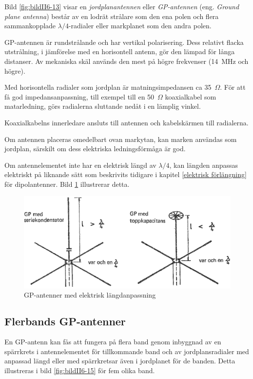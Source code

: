 Bild \ref{fig:bildII6-13} visar en \emph{jordplanantennen} eller
\emph{GP-antennen} (eng. \emph{Ground plane antenna}) består av en
lodrät strålare som den ena polen och flera sammankopplade
\(\lambda/4\)-radialer eller markplanet som den andra polen.

GP-antennen är rundstrålande och har vertikal polarisering.
Dess relativt flacka utstrålning, i jämförelse med en horisontell antenn,
gör den lämpad för långa distanser.
Av mekaniska skäl används den mest på högre frekvenser (14~MHz och högre).

Med horisontella radialer som jordplan är matningsimpedansen ca 35~\(\Omega\).
För att få god impedansanpassning, till exempel till en 50~\(\Omega\) koaxialkabel
som matarledning, görs radialerna sluttande nedåt i en lämplig vinkel.

Koaxialkabelns innerledare ansluts till antennen och kabelskärmen till
radialerna.

Om antennen placeras omedelbart ovan markytan, kan marken användas som
jordplan, särskilt om dess elektriska ledningsförmåga är god.

Om antennelementet inte har en elektrisk längd av \(\lambda/4\), kan
längden anpassas elektriskt på liknande sätt som beskrivits tidigare i
kapitel \ref{elektrisk förlängning} för dipolantenner.
Bild \ref{fig:bildII6-14} illustrerar detta.

\begin{figure}
  \includegraphics[width=\textwidth]{images/cropped_pdfs/bild_2_6-14.pdf}
  \caption{GP-antenner med elektrisk längdanpassning}
  \label{fig:bildII6-14}
\end{figure}

\subsection{Flerbands GP-antenner}

En GP-antenn kan fås att fungera på flera band genom inbyggnad av en spärrkrets
i antennelementet för tillkommande band och av jordplansradialer med anpassad
längd eller med spärrkretsar även i jordplanet för de banden.
Detta illustreras i bild \ref{fig:bildII6-15} för fem olika band.

